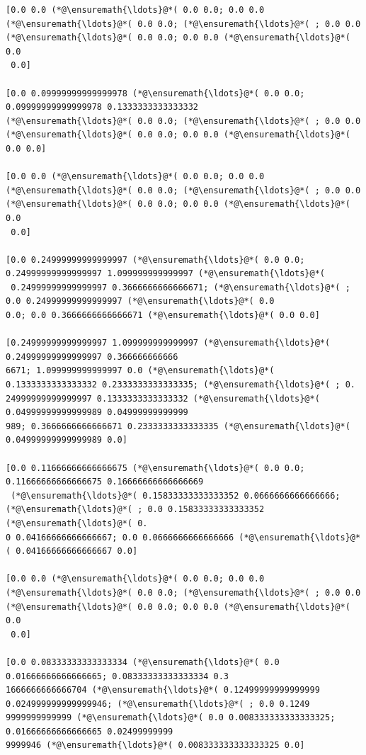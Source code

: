 \documentclass[12pt,a4paper]{article}
\begin{document}
\begin{lstlisting}
[0.0 0.0 (*@\ensuremath{\ldots}@*( 0.0 0.0; 0.0 0.0 (*@\ensuremath{\ldots}@*( 0.0 0.0; (*@\ensuremath{\ldots}@*( ; 0.0 0.0 (*@\ensuremath{\ldots}@*( 0.0 0.0; 0.0 0.0 (*@\ensuremath{\ldots}@*( 0.0
 0.0]

[0.0 0.09999999999999978 (*@\ensuremath{\ldots}@*( 0.0 0.0; 0.09999999999999978 0.1333333333333332 
(*@\ensuremath{\ldots}@*( 0.0 0.0; (*@\ensuremath{\ldots}@*( ; 0.0 0.0 (*@\ensuremath{\ldots}@*( 0.0 0.0; 0.0 0.0 (*@\ensuremath{\ldots}@*( 0.0 0.0]

[0.0 0.0 (*@\ensuremath{\ldots}@*( 0.0 0.0; 0.0 0.0 (*@\ensuremath{\ldots}@*( 0.0 0.0; (*@\ensuremath{\ldots}@*( ; 0.0 0.0 (*@\ensuremath{\ldots}@*( 0.0 0.0; 0.0 0.0 (*@\ensuremath{\ldots}@*( 0.0
 0.0]

[0.0 0.24999999999999997 (*@\ensuremath{\ldots}@*( 0.0 0.0; 0.24999999999999997 1.099999999999997 (*@\ensuremath{\ldots}@*(
 0.24999999999999997 0.3666666666666671; (*@\ensuremath{\ldots}@*( ; 0.0 0.24999999999999997 (*@\ensuremath{\ldots}@*( 0.0 
0.0; 0.0 0.3666666666666671 (*@\ensuremath{\ldots}@*( 0.0 0.0]

[0.24999999999999997 1.099999999999997 (*@\ensuremath{\ldots}@*( 0.24999999999999997 0.366666666666
6671; 1.099999999999997 0.0 (*@\ensuremath{\ldots}@*( 0.1333333333333332 0.2333333333333335; (*@\ensuremath{\ldots}@*( ; 0.
24999999999999997 0.1333333333333332 (*@\ensuremath{\ldots}@*( 0.04999999999999989 0.04999999999999
989; 0.3666666666666671 0.2333333333333335 (*@\ensuremath{\ldots}@*( 0.04999999999999989 0.0]

[0.0 0.11666666666666675 (*@\ensuremath{\ldots}@*( 0.0 0.0; 0.11666666666666675 0.16666666666666669
 (*@\ensuremath{\ldots}@*( 0.15833333333333352 0.0666666666666666; (*@\ensuremath{\ldots}@*( ; 0.0 0.15833333333333352 (*@\ensuremath{\ldots}@*( 0.
0 0.04166666666666667; 0.0 0.0666666666666666 (*@\ensuremath{\ldots}@*( 0.04166666666666667 0.0]

[0.0 0.0 (*@\ensuremath{\ldots}@*( 0.0 0.0; 0.0 0.0 (*@\ensuremath{\ldots}@*( 0.0 0.0; (*@\ensuremath{\ldots}@*( ; 0.0 0.0 (*@\ensuremath{\ldots}@*( 0.0 0.0; 0.0 0.0 (*@\ensuremath{\ldots}@*( 0.0
 0.0]

[0.0 0.08333333333333334 (*@\ensuremath{\ldots}@*( 0.0 0.01666666666666665; 0.08333333333333334 0.3
1666666666666704 (*@\ensuremath{\ldots}@*( 0.12499999999999999 0.024999999999999946; (*@\ensuremath{\ldots}@*( ; 0.0 0.1249
9999999999999 (*@\ensuremath{\ldots}@*( 0.0 0.008333333333333325; 0.01666666666666665 0.02499999999
9999946 (*@\ensuremath{\ldots}@*( 0.008333333333333325 0.0]


\end{lstlisting}
\end{document}
